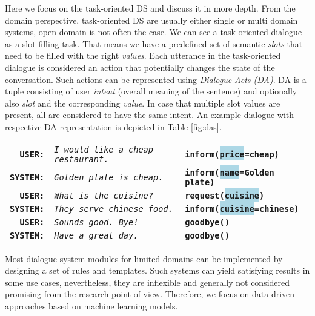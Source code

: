 Here we focus on the task-oriented DS and discuss it in more depth.
From the domain perspective, task-oriented DS are usually either single or multi domain systems, open-domain is not often the case.
We can see a task-oriented dialogue as a slot filling task.
That means we have a predefined set of semantic \textit{slots} that need to be filled with the right \textit{values}.
Each utterance in the task-oriented dialogue is considered an action that potentially changes the state of the conversation.
Such actions can be represented using \textit{Dialogue Acts (DA)}\cite{core1997coding}.
DA is a tuple consisting of user \textit{intent} (overall meaning of the sentence) and optionally also \textit{slot} and the corresponding \textit{value}.
In case that multiple slot values are present, all are considered to have the same intent.
An example dialogue with respective DA representation is depicted in Table \ref{fig:das}.
\begin{table*}[t]
\small
\setlength\fboxsep{2pt}
        \centering
        \begin{tabular}{rll}
        \textbf{\texttt{USER:}} & \textit{\texttt{I would like a cheap restaurant.}} & \textbf{\texttt{\colorbox{pastelyellow}{inform}(\colorbox{lightblue}{price}=\colorbox{pastelgreen}{cheap})}} \\
        \textbf{\texttt{SYSTEM:}} & \textit{\texttt{Golden plate is cheap.}} & \textbf{\texttt{\colorbox{pastelyellow}{inform}(\colorbox{lightblue}{name}=\colorbox{pastelgreen}{Golden plate})}} \\
        \hdashline[1.5pt/2pt]
        \textbf{\texttt{USER:}} & \textit{\texttt{What is the cuisine?}} & \textbf{\texttt{\colorbox{pastelyellow}{request}(\colorbox{lightblue}{cuisine})}} \\
        \textbf{\texttt{SYSTEM:}} & \textit{\texttt{They serve chinese food.}} & \textbf{\texttt{\colorbox{pastelyellow}{inform}(\colorbox{lightblue}{cuisine}=\colorbox{pastelgreen}{chinese})}} \\
        \hdashline[1.5pt/2pt]
        \textbf{\texttt{USER:}} & \textit{\texttt{Sounds good. Bye!}} & \textbf{\texttt{\colorbox{pastelyellow}{goodbye}()}} \\
        \textbf{\texttt{SYSTEM:}} & \textit{\texttt{Have a great day.}} & \textbf{\texttt{\colorbox{pastelyellow}{goodbye}()}} \\
        \end{tabular}
\normalsize
        \caption{Example of task-oriented dialogue in the restaurant reservation domain. Utterance representations as dialogue acts are depicted on the right. Intents are highlighted in orange, slot names in blue and respective values in green. Note that not all dialogue acts include slots and values}
    \label{fig:das}
\end{table*}
Most dialogue system modules for limited domains can be implemented by designing a set of rules and templates.
Such systems can yield satisfying results in some use cases, nevertheless, they are inflexible and generally not considered promising from the research point of view.
Therefore, we focus on data-driven approaches based on machine learning models.

